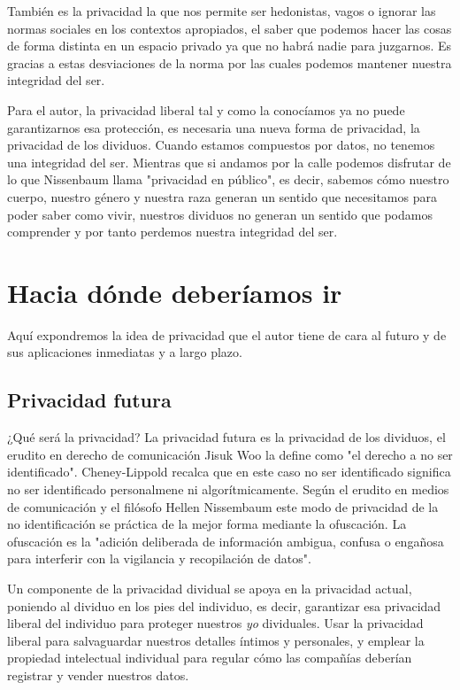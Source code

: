 \documentclass[11pt]{article}
\begin{document}
También es la privacidad la que nos permite ser hedonistas, vagos o ignorar las normas sociales en los contextos apropiados, el saber que podemos hacer las cosas de forma distinta en un espacio privado ya que no habrá nadie para juzgarnos. Es gracias a estas desviaciones de la norma por las cuales podemos mantener nuestra integridad del ser.

Para el autor, la privacidad liberal tal y como la conocíamos ya no puede garantizarnos esa protección, es necesaria una nueva forma de privacidad, la privacidad de los dividuos. Cuando estamos compuestos por datos, no tenemos una integridad del ser. Mientras que si andamos por la calle podemos disfrutar de lo que Nissenbaum llama "privacidad en público", es decir, sabemos cómo nuestro cuerpo, nuestro género y nuestra raza generan un sentido que necesitamos para poder saber como vivir, nuestros dividuos no generan un sentido que podamos comprender y por tanto perdemos nuestra integridad del ser.
\section{Hacia dónde deberíamos ir}
Aquí expondremos la idea de privacidad que el autor tiene de cara al futuro y de sus aplicaciones inmediatas y a largo plazo.
\subsection{Privacidad futura}
¿Qué será la privacidad? La privacidad futura es la privacidad de los dividuos, el erudito en derecho de comunicación Jisuk Woo la define como "el derecho a no ser identificado". Cheney-Lippold recalca que en este caso no ser identificado significa no ser identificado personalmene ni algorítmicamente. Según el erudito en medios de comunicación y el filósofo Hellen Nissembaum este modo de privacidad de la no identificación se práctica de la mejor forma mediante la ofuscación. La ofuscación es la "adición deliberada de información ambigua, confusa o engañosa para interferir con la vigilancia y recopilación de datos".

Un componente de la privacidad dividual se apoya en la privacidad actual, poniendo al dividuo en los pies del individuo, es decir, garantizar esa privacidad liberal del individuo para proteger nuestros \textit{yo} dividuales. Usar la privacidad liberal para salvaguardar nuestros detalles íntimos y personales, y emplear la propiedad intelectual individual para regular cómo las compañías deberían registrar y vender nuestros datos.
\end{document}
